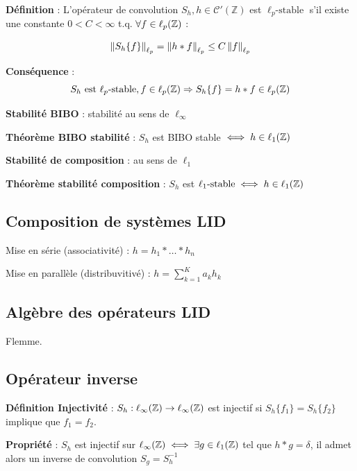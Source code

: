 \textbf{Définition} : L'opérateur de convolution $S_h, h \in\mathcal{C'}(\mathbb{Z})$ est $\ell_p\text{-stable}$ s'il existe une constante $0<C<\infty$ t.q. $\forall f\in\ell_{p}(\mathbb{Z})$ : 

\begin{equation*}
    \left\lVert S_h\{f\}\right\rVert_{\ell_{p}} = \left\lVert h*f\right\rVert_{\ell_{p}} \leq C\left\lVert f\right\rVert_{\ell_{p}}
\end{equation*}

\textbf{Conséquence} : 
\begin{equation*}
    S_h \text{ est } \ell_p\text{-stable}, f\in\ell_{p}(\mathbb{Z}) \Rightarrow S_h\{f\} = h*f \in \ell_{p}(\mathbb{Z})
\end{equation*}

\textbf{Stabilité BIBO} : stabilité au sens de $\ell_\infty$

\textbf{Théorème BIBO stabilité} : $S_h$ est BIBO stable $\iff h \in\ell_{1}(\mathbb{Z})$ 

\textbf{Stabilité de composition} : au sens de $\ell_1$

\textbf{Théorème stabilité composition} : $S_h$ est $\ell_1\text{-stable} \iff h\in\ell_{1}(\mathbb{Z})$

\subsection*{Composition de systèmes LID}

\begin{myitemize}
    \item Mise en série (associativité) : $h = h_1 * \dots * h_n$
    \item Mise en parallèle (distribuvitivé) : $h = \sum_{k=1}^K a_kh_k$
\end{myitemize}

\subsection*{Algèbre des opérateurs LID}

Flemme.

\subsection*{Opérateur inverse}

\textbf{Définition Injectivité} : $S_h : \ell_{\infty}(\mathbb{Z})\rightarrow\ell_{\infty}(\mathbb{Z})$ est injectif si $S_h\{f_1\} = S_h\{f_2\}$ implique que $f_1=f_2$.

\textbf{Propriété} : $S_h$ est injectif sur $\ell_{\infty}(\mathbb{Z}) \iff \exists g\in \ell_{1}(\mathbb{Z})$ tel que $h*g=\delta$, il admet alors un inverse de convolution $S_g=S_h^{-1}$  

